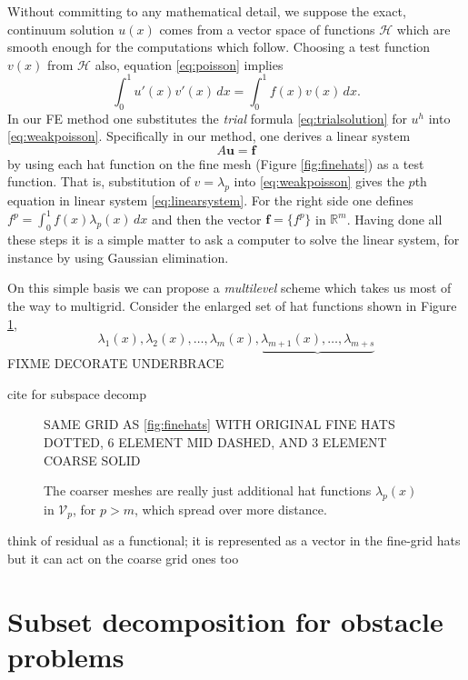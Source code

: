 \documentclass[letterpaper,final,12pt,reqno]{amsart}
\newcommand{\RR}{\mathbb{R}}
\newcommand{\bbf}{\mathbf{f}}
\newcommand{\bu}{\mathbf{u}}
\begin{document}
Without committing to any mathematical detail, we suppose the exact, continuum solution $u(x)$ comes from a vector space of functions $\mathcal{H}$ which are smooth enough for the computations which follow.  Choosing a test function $v(x)$ from $\mathcal{H}$ also, equation \eqref{eq:poisson} implies
\begin{equation}
\int_0^1 u'(x) v'(x)\,dx = \int_0^1 f(x) v(x)\, dx.
\label{eq:weakpoisson}
\end{equation}
In our FE method one substitutes the \emph{trial} formula \eqref{eq:trialsolution} for $u^h$ into \eqref{eq:weakpoisson}.  Specifically in our method, one derives a linear system
\begin{equation}
A \bu = \bbf \label{eq:linearsystem}
\end{equation}
by using each hat function on the fine mesh (Figure \ref{fig:finehats}) as a test function.  That is, substitution of $v=\lambda_p$ into \eqref{eq:weakpoisson} gives the $p$th equation in linear system \eqref{eq:linearsystem}.  For the right side one defines $f^p = \int_0^1 f(x) \lambda_p(x)\,dx$ and then the vector $\bbf = \{f^p\}$ in $\RR^m$.  Having done all these steps it is a simple matter to ask a computer to solve the linear system, for instance by using Gaussian elimination.

On this simple basis we can propose a \emph{multilevel} scheme which takes us most of the way to multigrid.  Consider the enlarged set of hat functions shown in Figure \ref{fig:multilevelhats},
    $$\lambda_1(x),\lambda_2(x),\dots,\lambda_m(x),\underbrace{\lambda_{m+1}(x),\dots,\lambda_{m+s}}$$
FIXME DECORATE UNDERBRACE

cite for subspace decomp \cite{Xu1992}

\begin{figure}
SAME GRID AS \eqref{fig:finehats} WITH ORIGINAL FINE HATS DOTTED, 6 ELEMENT MID DASHED, AND 3 ELEMENT COARSE SOLID
\caption{The coarser meshes are really just additional hat functions $\lambda_p(x)$ in $\mathcal{V}_p$, for $p>m$, which spread over more distance.}
\label{fig:multilevelhats}
\end{figure}


think of residual as a functional; it is represented as a vector in the fine-grid hats but it can act on the coarse grid ones too


\section{Subset decomposition for obstacle problems} \label{sec:obstacle}
\end{document}
